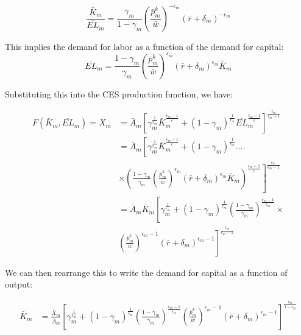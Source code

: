 \documentclass[letterpaper,12pt]{article}
\theoremstyle{definition}
\begin{document}
\begin{spacing}{1.5}
\begin{equation}
\frac{\bar{K}_{m}}{\overline{EL}_{m}} = \frac{\gamma_{m}}{1-\gamma_{m}}\left(\frac{\bar{p}^{k}_{m}}{\bar{w}} \right)^{-\epsilon_{m}}\left( \bar{r}+ \delta_{m}\right)^{-\epsilon_{m}}
\end{equation}

This implies the demand for labor as a function of the demand for capital:
\begin{equation}
\label{eqn:l_demand_dyn_ss}
\overline{EL}_{m} = \frac{1-\gamma_{m}}{\gamma_{m}}\left(\frac{\bar{p}^{k}_{m}}{\bar{w}} \right)^{\epsilon_{m}}\left( \bar{r}+ \delta_{m}\right)^{\epsilon_{m}}\bar{K}_{m}
\end{equation}

Substituting this into the CES production function, we have:

\begin{equation}
\begin{split}
F(\bar{K}_{m},\overline{EL}_{m})=X_{m} & = \bar{A}_{m}\left[\gamma_{m}^{\frac{1}{\epsilon_{m}}}\bar{K}_{m}^{\frac{\epsilon_{m}-1}{\epsilon}} + (1-\gamma_{m})^{\frac{1}{\epsilon_{m}}}\overline{EL}_{m}^{\frac{\epsilon_{m}-1}{\epsilon}} \right]^{\frac{\epsilon_{m}}{\epsilon_{m}-1}} \\
& = \bar{A}_{m}\left[\gamma_{m}^{\frac{1}{\epsilon_{m}}}\bar{K}_{m}^{\frac{\epsilon_{m}-1}{\epsilon}} + (1-\gamma_{m})^{\frac{1}{\epsilon_{m}}}.... \right. \\
& \left. \times \left(\frac{1-\gamma_{m}}{\gamma_{m}}\left(\frac{\bar{p}^{k}_{m}}{\bar{w}} \right)^{\epsilon_{m}}\left( \bar{r}+ \delta_{m}\right)^{\epsilon_{m}}\bar{K}_{m}\right)^{\frac{\epsilon_{m}-1}{\epsilon}} \right]^{\frac{\epsilon_{m}}{\epsilon_{m}-1}}  \\
& = \bar{A}_{m}\bar{K}_{m}\left[\gamma_{m}^{\frac{1}{\epsilon_{m}}} + (1-\gamma_{m})^{\frac{1}{\epsilon_{m}}} \left(\frac{1-\gamma_{m}}{\gamma_{m}}\right)^{\frac{\epsilon_{m}-1}{\epsilon_{m}}} \times \right. \\
& \left.  \left(\frac{\bar{p}^{k}_{m}}{\bar{w}} \right)^{\epsilon_{m}-1}\left( \bar{r}+\delta_{m}\right)^{\epsilon_{m}-1}  \right]^{\frac{\epsilon_{m}}{\epsilon_{m}-1}}
\end{split}
\end{equation}

We can then rearrange this to write the demand for capital as a function of output:

\begin{equation}
\begin{split}
\label{eqn:k_demand_dyn_ss}
\bar{K}_{m} &= \frac{\bar{X}_{m}}{\bar{A}_{m}}\left[\gamma_{m}^{\frac{1}{\epsilon_{m}}} + (1-\gamma_{m})^{\frac{1}{\epsilon_{m}}} \left(\frac{1-\gamma_{m}}{\gamma_{m}}\right)^{\frac{\epsilon_{m}-1}{\epsilon_{m}}} \left(\frac{\bar{p}^{k}_{m}}{\bar{w}} \right)^{\epsilon_{m}-1}\left( \bar{r}+\delta_{m}\right)^{\epsilon_{m}-1}  \right]^{\frac{\epsilon_{m}}{1-\epsilon_{m}}}
\end{split}
\end{equation}


\end{spacing}
\end{document}
